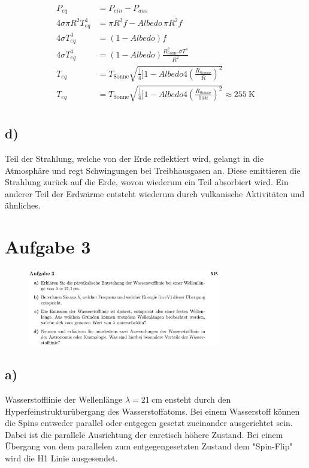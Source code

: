 \begin{align}
P_{eq} &= P_{ein}-P_{aus}\\
4 \sigma \pi R^2 T_{eq}^4 &= \pi R^2 f - Albedo\, \pi R^2 f\\
4 \sigma T_{eq}^4 &= (1-Albedo)f\\
4 \sigma T_{eq}^4 &= (1-Albedo) \frac{R_{\text{Sonne}}^2 \sigma T^4}{R^2}\\
T_{eq} & = T_{\text{Sonne}} \sqrt{\frac[4]{1-Albedo}{4}\left(\frac{R_{\text{Sonne}}}{R} \right)^2 }\\
T_{eq} & = T_{\text{Sonne}} \sqrt{\frac[4]{1-Albedo}{4}\left(\frac{R_{\text{Sonne}}}{1au} \right)^2 } \approx \SI{255}{\kelvin} \\
\end{align}

\subsection{d)}

\justifying Teil der Strahlung, welche von der Erde reflektiert wird, gelangt in die Atmosphäre und
regt Schwingungen bei Treibhausgasen an. Diese emittieren die Strahlung zurück auf die Erde,
wovon wiederum ein Teil absorbiert wird.
Ein anderer Teil der Erdwärme entsteht wiederum durch vulkanische Aktivitäten und ähnliches.

\section{Aufgabe 3}

\begin{figure}[H]
    \centering
    \includegraphics[width=0.75\textwidth]{images/Aufgabe_3.jpg}
    \label{fig:3}
\end{figure}

\subsection{a)}

\justifying Wasserstofflinie der Wellenlänge $\lambda = \SI{21}{\centi\meter} $ ensteht durch den
Hyperfeinstrukturübergang des Wasserstoffatoms. Bei einem Wasserstoff können
die Spins entweder parallel oder entgegen gesetzt zueinander ausgerichtet sein.
Dabei ist die parallele Ausrichtung der enretisch höhere Zustand. Bei einem
Übergang von dem parallelen zum entgegengesetzten Zustand dem "Spin-Flip" wird
die H1 Linie ausgesendet.


